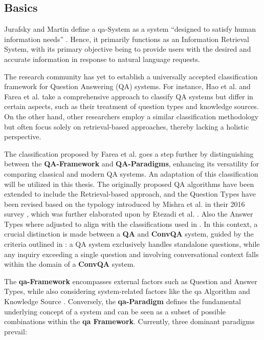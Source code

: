 \subsection{Basics}
\label{subsec:qa_basics}

Jurafsky and Martin define a \gls{qa}-System as a system \enquote{designed to satisfy human information needs} \cite{jurafsky_speech_2023}. Hence, it primarily functions as an Information Retrieval System, with its primary objective being to provide users with the desired and accurate information in response to natural language requests.

The research community has yet to establish a universally accepted classification framework for Question Answering (QA) systems. For instance, Hao et al. and Farea et al. \cite{hao_recent_2022, farea_evaluation_2022} take a comprehensive approach to classify QA systems but differ in certain aspects, such as their treatment of question types and knowledge sources. On the other hand, other researchers \cite{zhu_retrieving_2021, jurafsky_speech_2023, etezadi_state_2023, zhang_survey_2023} employ a similar classification methodology but often focus solely on retrieval-based approaches, thereby lacking a holistic perspective.

The classification proposed by Farea et al. \cite{farea_evaluation_2022} goes a step further by distinguishing between the \textbf{QA-Framework} and \textbf{QA-Paradigms}, enhancing its versatility for comparing classical and modern QA systems. An adaptation of this classification will be utilized in this thesis. The originally proposed QA algorithms have been extended to include the Retrieval-based approach, and the Question Types have been revised based on the typology introduced by Mishra et al. in their 2016 survey \cite{mishra_survey_2016}, which was further elaborated upon by Etezadi et al. \cite{etezadi_state_2023}. Also the Answer Types where adjusted to align with the classifications used in \cite{mcdonald_detect_2022,dasigi_dataset_2021}. In this context, a crucial distinction is made between a \textbf{QA} and \textbf{ConvQA} system, guided by the criteria outlined in \cite{zamani_conversational_2023}: a QA system exclusively handles standalone questions, while any inquiry exceeding a single question and involving conversational context falls within the domain of a \textbf{ConvQA} system.

The \textbf{\gls{qa}-Framework} encompasses external factors such as Question and Answer Types, while also considering system-related factors like the \gls{qa} Algorithm and Knowledge Source \cite{farea_evaluation_2022, hao_recent_2022}. Conversely, the \textbf{\gls{qa}-Paradigm} defines the fundamental underlying concept of a system and can be seen as a subset of possible combinations within the \textbf{\gls{qa} Framework}. Currently, three dominant paradigms prevail:

